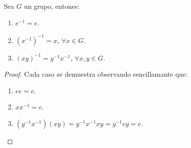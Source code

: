 \begin{prop}
    Sea $G$ un grupo, entones:
    \begin{enumerate}
        \item $e^{-1} = e$.
        \item ${(x^{-1})}^{-1} = x$, $\forall x\in G$.
        \item ${(xy)}^{-1} = y^{-1}x^{-1}$, $\forall x,y\in G$.
    \end{enumerate}
    \begin{proof} Cada caso se demuestra observando sencillamante que:
        \begin{enumerate}
            \item $e e = e$.
            \item $xx^{-1} = e$.
            \item $(y^{-1}x^{-1})(xy) = y^{-1}x^{-1}xy = y^{-1} e y = e$.
        \end{enumerate}
    \end{proof}
\end{prop}

